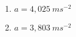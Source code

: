 
\begin{enumerate}[label=\alph*)]
 \item $a=4,025\ ms^{-2}$
\item $a=3,803\ ms^{-2}$
\end{enumerate}
